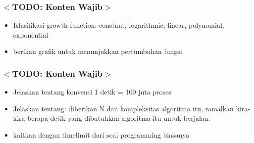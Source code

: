 \documentclass{beamer}
\begin{document}
\begin{frame}
\frametitle{$<$TODO: Konten Wajib$>$}
\begin{itemize}
	\item Klasifikasi growth function: constant, logarithmic, linear, polynomial, exponential
	\item berikan grafik untuk menunjukkan pertumbuhan fungsi
\end{itemize}
\end{frame}

\begin{frame}
\frametitle{$<$TODO: Konten Wajib$>$}
\begin{itemize}
	\item Jelaskan tentang konvensi 1 detik = 100 juta proses
	\item Jelaskan tentang: diberikan N dan kompleksitas algoritma itu, ramalkan kira-kira berapa detik yang dibutuhkan algoritma itu untuk berjalan.
	\item kaitkan dengan timelimit dari soal programming biasanya
\end{itemize}
\end{frame}
\end{document}
